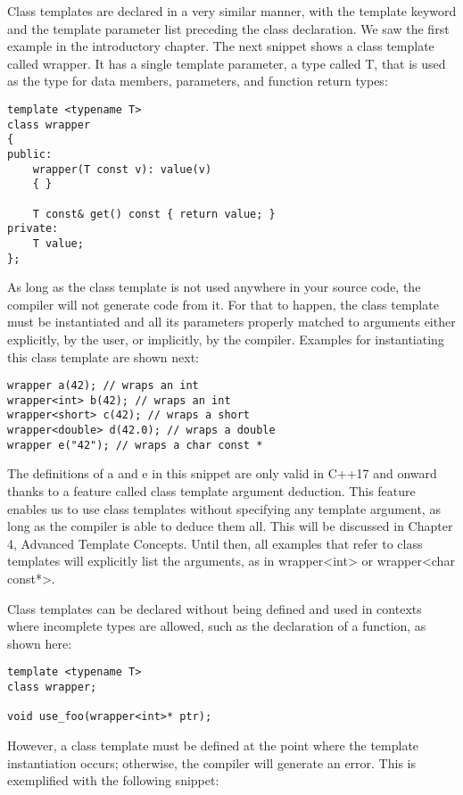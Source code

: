 Class templates are declared in a very similar manner, with the template keyword and the template parameter list preceding the class declaration. We saw the first example in the introductory chapter. The next snippet shows a class template called wrapper. It has a single template parameter, a type called T, that is used as the type for data members, parameters, and function return types:

\begin{lstlisting}[style=styleCXX]
template <typename T>
class wrapper
{
public:
	wrapper(T const v): value(v)
	{ }
	
	T const& get() const { return value; }
private:
	T value;
};
\end{lstlisting}

As long as the class template is not used anywhere in your source code, the compiler will not generate code from it. For that to happen, the class template must be instantiated and all its parameters properly matched to arguments either explicitly, by the user, or implicitly, by the compiler. Examples for instantiating this class template are shown next:

\begin{lstlisting}[style=styleCXX]
wrapper a(42); // wraps an int
wrapper<int> b(42); // wraps an int
wrapper<short> c(42); // wraps a short
wrapper<double> d(42.0); // wraps a double
wrapper e("42"); // wraps a char const *
\end{lstlisting}

The definitions of a and e in this snippet are only valid in C++17 and onward thanks to a feature called class template argument deduction. This feature enables us to use class templates without specifying any template argument, as long as the compiler is able to deduce them all. This will be discussed in Chapter 4, Advanced Template Concepts. Until then, all examples that refer to class templates will explicitly list the arguments, as in wrapper<int> or wrapper<char const*>.

Class templates can be declared without being defined and used in contexts where incomplete types are allowed, such as the declaration of a function, as shown here:

\begin{lstlisting}[style=styleCXX]
template <typename T>
class wrapper;

void use_foo(wrapper<int>* ptr);
\end{lstlisting}

However, a class template must be defined at the point where the template instantiation occurs; otherwise, the compiler will generate an error. This is exemplified with the following snippet:


